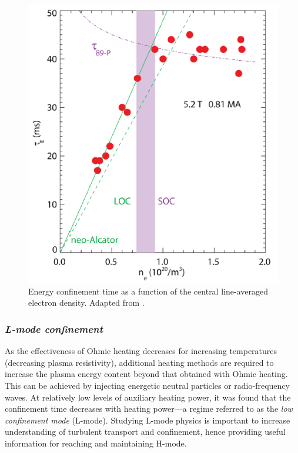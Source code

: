 \begin{figure}[h]
\begin{centering}
\includegraphics[scale=0.6]{loc_soc.png}
\par\end{centering}
\caption[Energy confinement time as a function of the central line-averaged density]{Energy confinement time as a function of the central line-averaged electron density. Adapted from \cite{Rice_2012_PoP}.}
\label{fig:loc_soc}
\end{figure}


\subsubsection*{\emph{L-mode confinement}}

As the effectiveness of Ohmic heating decreases for increasing temperatures (decreasing plasma resistivity), additional heating methods are required to increase the plasma energy content beyond that obtained with Ohmic heating. This can be achieved by injecting energetic neutral particles or radio-frequency waves. At relatively low levels of auxiliary heating power, it was found that the confinement time decreases with heating power---a regime referred to as the \emph{low confinement mode} (L-mode). Studying L-mode physics is important to increase understanding of turbulent transport and confinement, hence providing useful information for reaching and maintaining H-mode.


